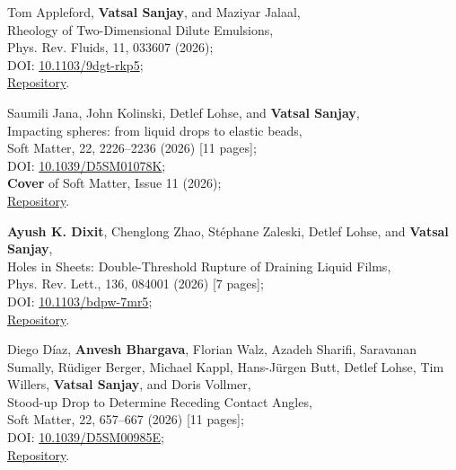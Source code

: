	\item Tom Appleford, \textbf{Vatsal Sanjay}, and Maziyar Jalaal,\\
	Rheology of Two-Dimensional Dilute Emulsions,\\
	Phys. Rev. Fluids, 11, 033607 (2026);\\
	\faFile\hspace{0.2em}DOI: \href{https://doi.org/10.1103/9dgt-rkp5}{10.1103/9dgt-rkp5};\\
	\faGithub\hspace{0.2em}\href{https://github.com/tappleford/droplet_under_shear_newtonian_2D}{Repository}.

	\item Saumili Jana, John Kolinski, Detlef Lohse, and \textbf{Vatsal Sanjay},\\
	Impacting spheres: from liquid drops to elastic beads,\\
	Soft Matter, 22, 2226--2236 (2026) [11 pages];\\
	\faFile\hspace{0.2em}DOI: \href{https://doi.org/10.1039/D5SM01078K}{10.1039/D5SM01078K};\\
	\faStar\hspace{0.2em}\textbf{Cover} of Soft Matter, Issue 11 (2026);\\
	\faGithub\hspace{0.2em}\href{https://github.com/comphy-lab/Soft-Sphere-Impacts}{Repository}.

	\item \textbf{Ayush K. Dixit}, Chenglong Zhao, St\'ephane Zaleski, Detlef Lohse, and \textbf{Vatsal Sanjay},\\
	Holes in Sheets: Double-Threshold Rupture of Draining Liquid Films,\\
	Phys. Rev. Lett., 136, 084001 (2026) [7 pages];\\
	\faFile\hspace{0.2em}DOI: \href{https://doi.org/10.1103/bdpw-7mr5}{10.1103/bdpw-7mr5};\\
	\faGithub\hspace{0.2em}\href{https://github.com/comphy-lab/HoleySheet}{Repository}.

	\item Diego Díaz, \textbf{Anvesh Bhargava}, Florian Walz, Azadeh Sharifi, Saravanan Sumally, Rüdiger Berger, Michael Kappl, Hans-Jürgen Butt, Detlef Lohse, Tim Willers, \textbf{Vatsal Sanjay}, and Doris Vollmer,\\
	Stood-up Drop to Determine Receding Contact Angles,\\
	Soft Matter, 22, 657--667 (2026) [11 pages];\\
	\faFile\hspace{0.2em}DOI: \href{https://doi.org/10.1039/D5SM00985E}{10.1039/D5SM00985E};\\
	\faGithub\hspace{0.2em}\href{https://github.com/comphy-lab/Retracting-Droplet}{Repository}.

